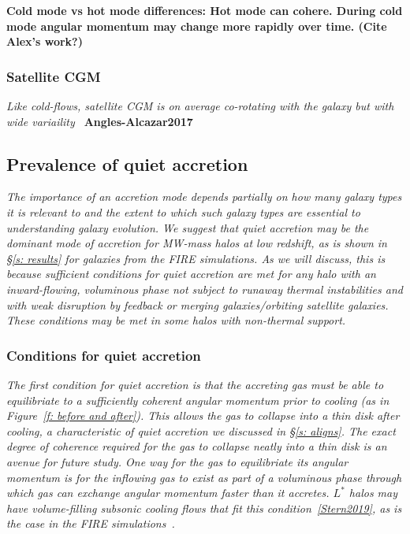 \documentclass[fleqn,usenatbib]{mnras}
\begin{document}
\textbf{Cold mode vs hot mode differences:
Hot mode can cohere.
During cold mode angular momentum may change more rapidly over time. (Cite Alex's work?)}

\subsubsection{Satellite CGM}

\textit{
Like cold-flows, satellite CGM is on average co-rotating with the galaxy but with wide variaility~\citep[e.g.][]{Stewart2011, Hafen2019}
}
\textbf{Angles-Alcazar2017}

\subsection{Prevalence of quiet accretion}
\label{s: prevalence}

\textit{
The importance of  an accretion mode depends partially on how many galaxy types it is relevant to and the extent to which such galaxy types are essential to understanding galaxy evolution.
We suggest that quiet accretion may be the dominant mode of accretion for MW-mass halos at low redshift, as is shown in \S\ref{s: results} for galaxies from the FIRE simulations.
As we will discuss, this is because sufficient conditions for quiet accretion are met for any halo with an inward-flowing, voluminous phase not subject to runaway thermal instabilities and with weak disruption by feedback or merging galaxies/orbiting satellite galaxies.
These conditions may be met in some halos with non-thermal support.
}

\subsubsection{Conditions for quiet accretion}

\textit{
The first condition for quiet accretion is that the accreting gas must be able to equilibriate to a sufficiently coherent angular momentum prior to cooling (as in Figure~\ref{f: before and after}).
This allows the gas to collapse into a thin disk after cooling, a characteristic of quiet accretion we discussed in \S\ref{s: aligns}.
The exact degree of coherence required for the gas to collapse neatly into a thin disk is an avenue for future study.
One way for the gas to equilibriate its angular momentum is for the inflowing gas to exist as part of a voluminous phase through which gas can exchange angular momentum faster than it accretes.
$L^*$ halos may have volume-filling subsonic cooling flows that fit this condition~\ref{Stern2019}, as is the case in the FIRE simulations~\citep{Stern2020}.
}
\end{document}
